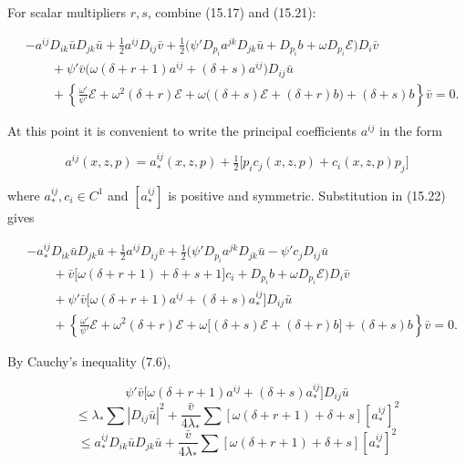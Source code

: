 For scalar multipliers \(r,s\), combine (15.17) and (15.21):

\begin{equation}
\begin{aligned}
&-a^{ij}D_{ik}\bar{u}D_{jk}\bar{u}+\tfrac12a^{ij}D_{ij}\bar{v}
+\tfrac12\bigl(\psi' D_{p_i}a^{jk}D_{jk}\bar{u}+D_{p_i}b+\omega D_{p_i}\mathcal{E}\bigr)D_i\bar{v}\\
&\qquad+\psi'\bar{v}\bigl(\omega(\delta+r+1)a^{ij}+(\delta+s)a^{ij}\bigr)D_{ij}\bar{u}\\
&\qquad+\left\{\frac{\omega'}{\psi'}\mathcal{E}+\omega^2(\delta+r)\mathcal{E}
+\omega\bigl((\delta+s)\mathcal{E}+(\delta+r)b\bigr)+(\delta+s)b\right\}\bar{v}=0.
\end{aligned}
\tag{15.22}
\end{equation}

At this point it is convenient to write the principal coefficients $a^{ij}$ in the form

\begin{equation}
a^{ij}(x,z,p)=a^{ij}_{*}(x,z,p)+\tfrac12\bigl[p_ic_{j}(x,z,p)+c_i(x,z,p)p_j\bigr]
\tag{15.23}
\end{equation}

where \(a_*^{ij},c_i\in C^1\) and \([a_*^{ij}]\) is positive and symmetric.
Substitution in (15.22) gives

\begin{equation}
\begin{aligned}
&-a^{ij}_{*}D_{ik}\bar{u}D_{jk}\bar{u}+\tfrac12a^{ij}D_{ij}\bar{v}
+\tfrac12\bigl(\psi' D_{p_i}a^{jk}D_{jk}\bar{u}-\psi'c_jD_{ij}\bar{u}\\
&\qquad+\bar{v}\bigl[\omega(\delta+r+1)+\delta+s+1\bigr]c_i+D_{p_i}b+\omega D_{p_i}\mathcal{E}\bigr)D_i\bar{v}\\
&\qquad+\psi'\bar{v}\bigl[\omega(\delta+r+1)a^{ij}+(\delta+s)a^{ij}_{*}\bigr]D_{ij}\bar{u}\\
&\qquad+\left\{\frac{\omega'}{\psi'}\mathcal{E}+\omega^2(\delta+r)\mathcal{E}
+\omega\bigl[(\delta+s)\mathcal{E}+(\delta+r)b\bigr]+(\delta+s)b\right\}\bar{v}=0.
\end{aligned}
\tag{15.24}
\end{equation}

By Cauchy's inequality (7.6),

\[
\psi'\bar{v}\bigl[\omega(\delta+r+1)a^{ij}+(\delta+s)a^{ij}_{*}\bigr]D_{ij}\bar{u}
\]
\[
\le \lambda_{*}\sum\left|D_{ij}\bar{u}\right|^2+\frac{\bar{v}}{4\lambda_{*}}
\sum\left[\omega(\delta+r+1)+\delta+s\right]\left[a^{ij}_{*}\right]^2
\]
\[
\le a^{ij}_{*}D_{ik}\bar{u}D_{jk}\bar{u}+\frac{\bar{v}}{4\lambda_{*}}
\sum\left[\omega(\delta+r+1)+\delta+s\right]\left[a^{ij}_{*}\right]^2
\]

